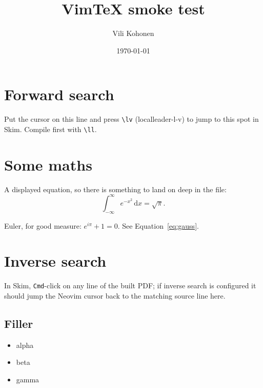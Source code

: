 \documentclass[11pt]{article}
\title{VimTeX smoke test}
\author{Vili Kohonen}
\date{\today}
\begin{document}
\maketitle

\section{Forward search}
Put the cursor on this line and press \texttt{\textbackslash lv} (localleader-l-v) to jump to this
spot in Skim. Compile first with \texttt{\textbackslash ll}.

\section{Some maths}
A displayed equation, so there is something to land on deep in the file:
\begin{equation}
  \int_{-\infty}^{\infty} e^{-x^2}\,\mathrm{d}x = \sqrt{\pi}.
  \label{eq:gauss}
\end{equation}

Euler, for good measure: $e^{i\pi} + 1 = 0$. See Equation~\eqref{eq:gauss}.

\section{Inverse search}
In Skim, \texttt{Cmd}-click on any line of the built PDF; if inverse search is configured it should
jump the Neovim cursor back to the matching source line here.

\subsection{Filler}
\begin{itemize}
  \item alpha
  \item beta
  \item gamma
\end{itemize}
\end{document}

